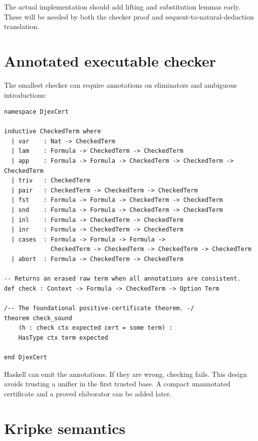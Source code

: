 \documentclass[11pt,letterpaper,openany]{report}
\theoremstyle{definition}
\theoremstyle{remark}
\begin{document}
The actual implementation should add lifting and substitution lemmas early. These will be needed by both the checker proof and sequent-to-natural-deduction translation.

\section{Annotated executable checker}

The smallest checker can require annotations on eliminators and ambiguous introductions:

\begin{lstlisting}[language=LeanFour,caption={A deliberately simple trusted checker interface.}]
namespace DjexCert

inductive CheckedTerm where
  | var    : Nat -> CheckedTerm
  | lam    : Formula -> CheckedTerm -> CheckedTerm
  | app    : Formula -> Formula -> CheckedTerm -> CheckedTerm -> CheckedTerm
  | triv   : CheckedTerm
  | pair   : CheckedTerm -> CheckedTerm -> CheckedTerm
  | fst    : Formula -> Formula -> CheckedTerm -> CheckedTerm
  | snd    : Formula -> Formula -> CheckedTerm -> CheckedTerm
  | inl    : Formula -> CheckedTerm -> CheckedTerm
  | inr    : Formula -> CheckedTerm -> CheckedTerm
  | cases  : Formula -> Formula -> Formula ->
             CheckedTerm -> CheckedTerm -> CheckedTerm -> CheckedTerm
  | abort  : Formula -> CheckedTerm -> CheckedTerm

-- Returns an erased raw term when all annotations are consistent.
def check : Context -> Formula -> CheckedTerm -> Option Term

/-- The foundational positive-certificate theorem. -/
theorem check_sound
    (h : check ctx expected cert = some term) :
    HasType ctx term expected

end DjexCert
\end{lstlisting}

Haskell can emit the annotations. If they are wrong, checking fails. This design avoids trusting a unifier in the first trusted base. A compact unannotated certificate and a proved elaborator can be added later.

\section{Kripke semantics}
\end{document}
